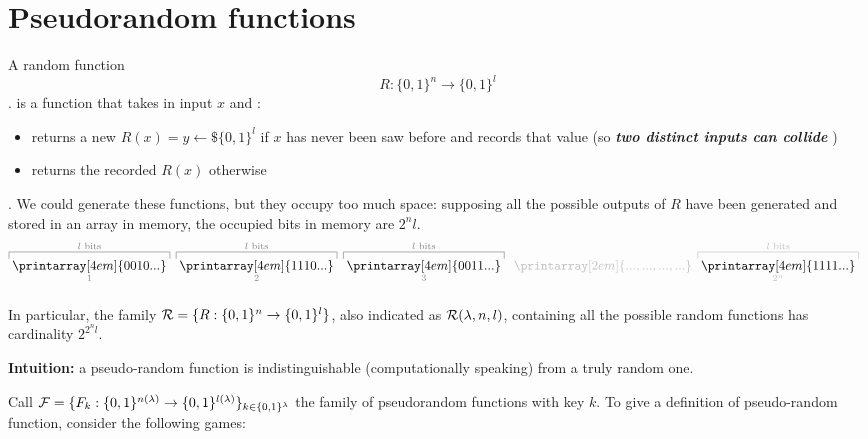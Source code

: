 \section{Pseudorandom functions}

A random function
\[  R:\{0,1\}^{n} \to \{0,1\}^{l} \].
is a function that takes in input $x$ and :
\begin{itemize}
    \item returns a new $R(x)=y \leftarrow\$ \{0,1\}^{l}$ if $x$ has never been
        saw before and records that value (so \textbf{ \textit{two distinct inputs can collide} })

    \item returns the recorded $R(x)$ otherwise
\end{itemize}.
We could generate these functions, but they occupy too much space: supposing all
the possible outputs of $R$ have been generated and stored in an array in memory, the
occupied bits in memory are $2^{n}l$.
\[  
    \color{black!50}%
    \overbracket[0.5pt][5pt]{{\thickspace}%
    \color{black}\printarray[4em]{0010...}\thickspace}^{l\textrm{ bits}}_{1}\thickspace%
    \overbracket[0.5pt][5pt]{{\thickspace}%
    \color{black}\printarray[4em]{1110...}\thickspace}^{l\textrm{ bits}}_{2}\thickspace%
    \overbracket[0.5pt][5pt]{{\thickspace}%
      \color{black}\printarray[4em]{0011...}\thickspace}^{l\textrm{ bits}}_{3}\thickspace%
    \color{black!25}\underbracket[0pt][5.5pt]{{\thickspace}%
      \printarray[2em]{...,...,...,...}\thickspace}_{}%
    \overbracket[0.5pt][5pt]{{\thickspace}%
      \color{black}\printarray[4em]{1111...}\thickspace}^{l\textrm{ bits}}_{2^{n}}\thickspace%
  \thickspace
\]

In particular, the family $\mathcal{R}=\{ R:\{0,1\}^{n} \to \{0,1\}^{l} \}$, also indicated as $\mathcal{R}(\lambda, n, l)$, containing all the possible random functions has cardinality $2^{2^{n}l}$.

\textbf{Intuition:} a pseudo-random function is indistinguishable (computationally speaking) from a truly random one.

Call $\mathcal{F}=\{ F_{k}:\{0,1\}^{n(\lambda)} \to \{0,1\}^{l(\lambda)} \}_{k \in
\{0,1\}^{\lambda}}$ the family of pseudorandom functions with key $k$. To give a
definition of pseudo-random function, consider the following games:




